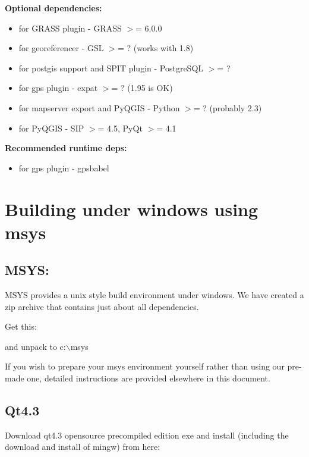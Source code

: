 \textbf{Optional dependencies:}

\begin {itemize}
\item for GRASS plugin - GRASS $>$= 6.0.0
\item for georeferencer - GSL $>$= ? (works with 1.8)
\item for postgis support and SPIT plugin - PostgreSQL $>$= ?
\item for gps plugin - expat $>$= ? (1.95 is OK)
\item for mapserver export and PyQGIS - Python $>$= ? (probably 2.3)
\item for PyQGIS - SIP $>$= 4.5, PyQt $>$= 4.1
\end{itemize}

\textbf{Recommended runtime deps:}

\begin {itemize}
\item for gps plugin - gpsbabel
\end{itemize}

\section{Building under windows using msys}
\subsection{MSYS:}
MSYS provides a unix style build environment under windows. We have created a
zip archive that contains just about all dependencies.

Get this: 


and unpack to c:$\backslash$msys

If you wish to prepare your msys environment yourself rather than using 
our pre-made one, detailed instructions are provided elsewhere in this
document.

\subsection{Qt4.3}
Download qt4.3 opensource precompiled edition exe and install (including the
download and install of mingw) from here:


